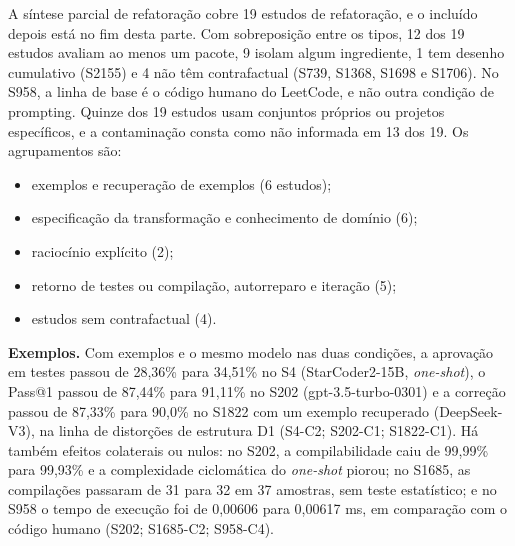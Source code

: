 A síntese parcial de refatoração cobre 19 estudos de refatoração, e o incluído depois está no fim desta parte. Com sobreposição entre os tipos, 12 dos 19 estudos avaliam ao menos um pacote, 9 isolam algum ingrediente, 1 tem desenho cumulativo (S2155) e 4 não têm contrafactual (S739, S1368, S1698 e S1706). No S958, a linha de base é o código humano do LeetCode, e não outra condição de prompting. Quinze dos 19 estudos usam conjuntos próprios ou projetos específicos, e a contaminação consta como não informada em 13 dos 19. Os agrupamentos são:
\begin{itemize}
  \item exemplos e recuperação de exemplos (6 estudos);
  \item especificação da transformação e conhecimento de domínio (6);
  \item raciocínio explícito (2);
  \item retorno de testes ou compilação, autorreparo e iteração (5);
  \item estudos sem contrafactual (4).
\end{itemize}

\textbf{Exemplos.}
Com exemplos e o mesmo modelo nas duas condições, a aprovação em testes passou de 28,36\% para 34,51\% no S4 (StarCoder2-15B, \textit{one-shot}), o Pass@1 passou de 87,44\% para 91,11\% no S202 (gpt-3.5-turbo-0301) e a correção passou de 87,33\% para 90,0\% no S1822 com um exemplo recuperado (DeepSeek-V3), na linha de distorções de estrutura D1 (S4-C2; S202-C1; S1822-C1).
Há também efeitos colaterais ou nulos: no S202, a compilabilidade caiu de 99,99\% para 99,93\% e a complexidade ciclomática do \textit{one-shot} piorou; no S1685, as compilações passaram de 31 para 32 em 37 amostras, sem teste estatístico; e no S958 o tempo de execução foi de 0,00606 para 0,00617 ms, em comparação com o código humano (S202; S1685-C2; S958-C4).


